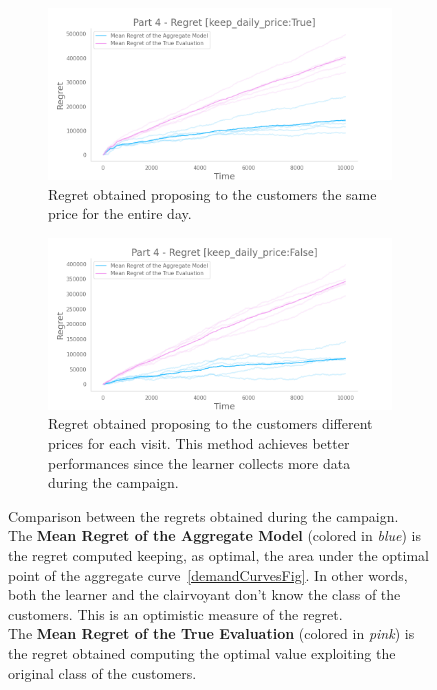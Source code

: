 \begin{figure}[!htb]
	\centering
	
	\begin{subfigure}[!H]{0.8\textwidth}
		\centering
		\includegraphics[width=\textwidth]{images/part4_keep-daily-priceTrue.png}
		\caption{Regret obtained proposing to the customers the same price for the entire day.}
	\end{subfigure}
	\begin{subfigure}[!H]{0.8\textwidth}
		\centering
		\includegraphics[width=\textwidth]{images/part4_keep-daily-priceFalse.png}
		\caption{Regret obtained proposing to the customers different prices for each visit. This method achieves better performances since the learner collects more data during the campaign.}
	\end{subfigure}

	\caption{Comparison between the regrets obtained during the campaign.\\
			The \textbf{Mean Regret of the Aggregate Model} (colored in \textit{blue}) is the regret computed keeping, as optimal, the area under the optimal point of the aggregate curve~\ref{demandCurvesFig}. In other words, both the learner and the clairvoyant don't know the class of the customers. This is an optimistic measure of the regret.\\
			The \textbf{Mean Regret of the True Evaluation} (colored in \textit{pink}) is the regret obtained computing the optimal value exploiting the original class of the customers.}
	\label{regret4Fig}
\end{figure}